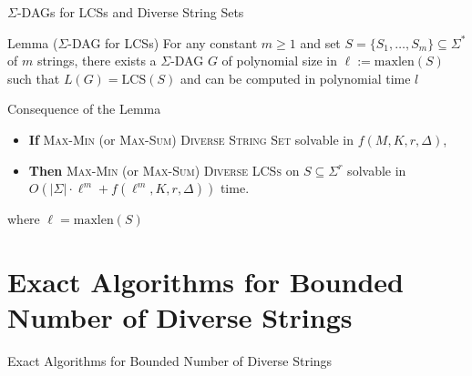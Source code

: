 \documentclass{beamer}
\begin{document}
\begin{frame}{$\Sigma$-DAGs for LCSs and Diverse String Sets}

    \begin{block}{Lemma ($\Sigma$-DAG for LCSs)}
        For any constant \( m \geq 1 \) and set \( S = \{S_1, \dots, S_m\} \subseteq \Sigma^* \) of \( m \) strings, there exists a $\Sigma$-DAG \( G \) of polynomial size in \( \ell := \text{maxlen}(S) \) such that \( L(G) = \text{LCS}(S) \) and can be computed in polynomial time $l$\\
    \end{block}


    \begin{exampleblock}{Consequence of the Lemma}
        \begin{itemize}
            \item \textbf{If} \textsc{Max-Min} (or \textsc{Max-Sum}) \textsc{Diverse String Set} solvable in \( f(M, K, r, \Delta) \),
            \item \textbf{Then} \textsc{Max-Min} (or \textsc{Max-Sum}) \textsc{Diverse LCSs} on \( S \subseteq \Sigma^r \) solvable in \( O(|\Sigma| \cdot \ell^m + f(\ell^m, K, r, \Delta)) \) time.
        \end{itemize}
        where \( \ell = \text{maxlen}(S) \)
    \end{exampleblock}

\end{frame}


\section{Exact Algorithms for Bounded Number of Diverse Strings}
\begin{frame}
    \begin{center}
        \huge{Exact Algorithms for Bounded Number of Diverse Strings}
    \end{center}
\end{frame}
\end{document}

